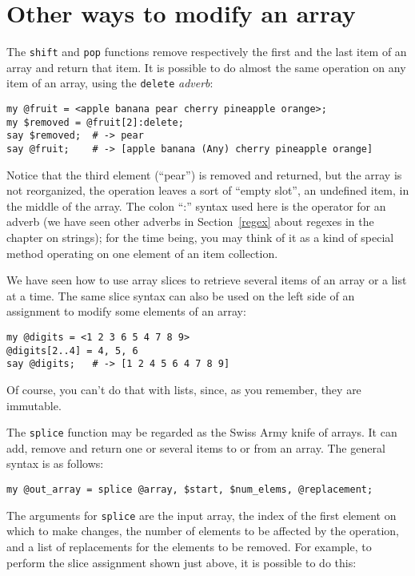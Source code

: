 \section{Other ways to modify an array}
\label{modify_array}

The {\tt shift} and {\tt pop} functions remove respectively 
the first and the last item of an array and return that 
item. It is possible to do almost the same operation on any item 
of an array, using the {\tt delete} \emph{adverb}:

\begin{verbatim}
my @fruit = <apple banana pear cherry pineapple orange>;
my $removed = @fruit[2]:delete; 
say $removed;  # -> pear
say @fruit;    # -> [apple banana (Any) cherry pineapple orange]
\end{verbatim}

Notice that the third element (``pear'') is removed and 
returned, but the array is not reorganized, the operation leaves 
a sort of ``empty slot'', an undefined item, in the 
middle of the array. The colon ``:'' syntax used here is the 
operator for an adverb (we have seen other adverbs in  
Section~\ref{regex} about regexes in the chapter on strings); 
for the time being, you may think of it as a kind of special 
method operating on one element of an item collection.

We have seen how to use array slices to retrieve several 
items of an array or a list at a time. The same slice syntax 
can also be used on the left side of an assignment to modify 
some elements of an array:

\begin{verbatim}
my @digits = <1 2 3 6 5 4 7 8 9>
@digits[2..4] = 4, 5, 6
say @digits;   # -> [1 2 4 5 6 4 7 8 9]
\end{verbatim}

Of course, you can't do that with lists, since, as you 
remember, they are immutable.

The {\tt splice} function may be regarded as the Swiss Army 
knife of arrays. It can add, remove and return one or 
several items to or from an array. The general syntax is 
as follows:

\begin{verbatim}
my @out_array = splice @array, $start, $num_elems, @replacement;
\end{verbatim}
%
The arguments for {\tt splice} are the input array, the index 
of the first element on which to make changes, the number of 
elements to be affected by the operation, and a list of 
replacements for the elements to be removed. For example, 
to perform the slice assignment shown just above, it is 
possible to do this:

